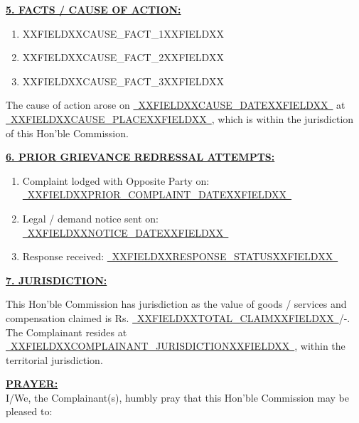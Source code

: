 \documentclass[12pt,a4paper]{article}
\newcommand{\fillline}[1]{\underline{~#1~}}
\begin{document}
\vspace{1em}

\noindent\textbf{\uline{5. FACTS / CAUSE OF ACTION:}}

\vspace{0.3em}
\begin{enumerate}[label=(\alph*), itemsep=0.6em]
    \item XXFIELDXXCAUSE_FACT_1XXFIELDXX
    \item XXFIELDXXCAUSE_FACT_2XXFIELDXX
    \item XXFIELDXXCAUSE_FACT_3XXFIELDXX
\end{enumerate}

\noindent The cause of action arose on \fillline{XXFIELDXXCAUSE_DATEXXFIELDXX} at \fillline{XXFIELDXXCAUSE_PLACEXXFIELDXX},
which is within the jurisdiction of this Hon'ble Commission.

\vspace{1em}

\noindent\textbf{\uline{6. PRIOR GRIEVANCE REDRESSAL ATTEMPTS:}}

\begin{enumerate}[label=(\alph*), itemsep=0.4em]
    \item Complaint lodged with Opposite Party on: \fillline{XXFIELDXXPRIOR_COMPLAINT_DATEXXFIELDXX}
    \item Legal / demand notice sent on: \fillline{XXFIELDXXNOTICE_DATEXXFIELDXX}
    \item Response received: \fillline{XXFIELDXXRESPONSE_STATUSXXFIELDXX}
\end{enumerate}

\vspace{1em}

\noindent\textbf{\uline{7. JURISDICTION:}}

\vspace{0.3em}
\noindent This Hon'ble Commission has jurisdiction as the value of goods / services and
compensation claimed is Rs. \fillline{XXFIELDXXTOTAL_CLAIMXXFIELDXX}/-. The Complainant resides at
\fillline{XXFIELDXXCOMPLAINANT_JURISDICTIONXXFIELDXX}, within the territorial jurisdiction.

\vspace{1em}

\noindent\textbf{\uline{PRAYER:}}\\
I/We, the Complainant(s), humbly pray that this Hon'ble Commission may be pleased to:
\end{document}
